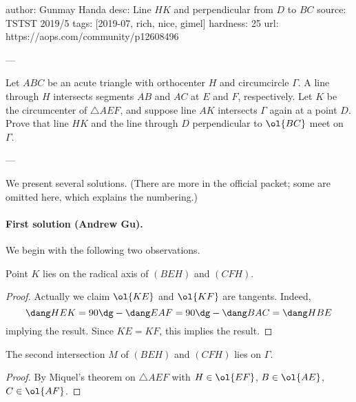 author: Gunmay Handa
desc: Line $HK$ and perpendicular from $D$ to $BC$
source: TSTST 2019/5
tags: [2019-07, rich, nice, gimel]
hardness: 25
url: https://aops.com/community/p12608496

---

Let $ABC$ be an acute triangle with orthocenter $H$ and circumcircle $\Gamma$.
A line through $H$ intersects segments $AB$ and $AC$ at $E$ and $F$, respectively.
Let $K$ be the circumcenter of $\triangle AEF$,
and suppose line $AK$ intersects $\Gamma$ again at a point $D$.
Prove that line $HK$ and the line through $D$
perpendicular to $\ol{BC}$ meet on $\Gamma$.

---

We present several solutions.
(There are more in the official packet; some are omitted here,
which explains the numbering.)

\paragraph{First solution (Andrew Gu).}
We begin with the following two observations.
\begin{claim*}
  Point $K$ lies on the radical axis of $(BEH)$ and $(CFH)$.
\end{claim*}
\begin{proof}
  Actually we claim $\ol{KE}$ and $\ol{KF}$ are tangents.
  Indeed,
  \[ \dang HEK = 90\dg - \dang EAF = 90\dg - \dang BAC = \dang HBE \]
  implying the result.
  Since $KE = KF$, this implies the result.
\end{proof}

\begin{claim*}
  The second intersection $M$ of $(BEH)$ and $(CFH)$ lies on $\Gamma$.
\end{claim*}
\begin{proof}
  By Miquel's theorem on $\triangle AEF$ with $H \in \ol{EF}$,
  $B \in \ol{AE}$, $C \in \ol{AF}$.
\end{proof}

